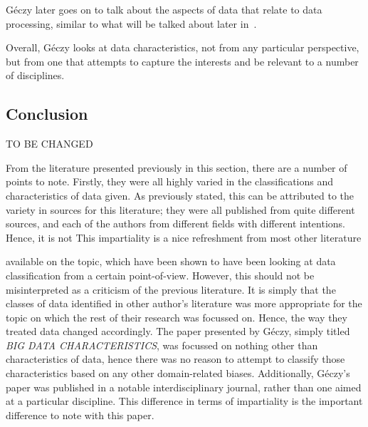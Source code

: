 \documentclass[a4paper,11pt]{article}
\begin{document}
G\'eczy later goes on to talk about the aspects of data that relate to data processing, similar to what will be talked
about later in~.

Overall, G\'eczy looks at data characteristics, not from any particular perspective, but from one that attempts to capture
the interests and be relevant to a number of disciplines.



\subsection{Conclusion} %
\label{sub:classification_conclusion}

TO BE CHANGED

From the literature presented previously in this section, there are a number of points to note. Firstly, they were all
highly varied in the classifications and characteristics of data given. As previously stated, this can be attributed
to the variety in sources for this literature; they were all published from quite different sources, and each of the
authors from different fields with different intentions. Hence, it is not
This impartiality is a nice refreshment from most other literature

available on the topic, which have been shown to have been looking at data classification from a certain point-of-view.
However, this should not be misinterpreted as a criticism of the previous literature. It is simply that the classes of
data identified in other author's literature was more appropriate for the topic on which the rest of their research was
focussed on. Hence, the way they treated data changed accordingly. The paper presented by G\'eczy, simply titled
\emph{BIG DATA CHARACTERISTICS}, was focussed on nothing other than characteristics of data, hence there was no reason
to attempt to classify those characteristics based on any other domain-related biases. Additionally, G\'eczy's paper was
published in a notable interdisciplinary journal, rather than one aimed at a particular discipline. This difference in
terms of impartiality is the important difference to note with this paper.



\newpage
\end{document}
